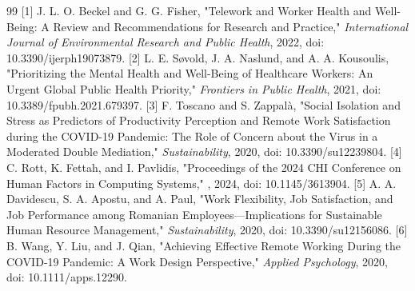 \documentclass[11pt]{article}
\begin{document}
\begin{thebibliography}{99}
 [1] J. L. O. Beckel and G. G. Fisher, "Telework and Worker Health and Well-Being: A Review and Recommendations for Research and Practice," \textit{International Journal of Environmental Research and Public Health}, 2022, doi: 10.3390/ijerph19073879.
 [2] L. E. Søvold, J. A. Naslund, and A. A. Kousoulis, "Prioritizing the Mental Health and Well-Being of Healthcare Workers: An Urgent Global Public Health Priority," \textit{Frontiers in Public Health}, 2021, doi: 10.3389/fpubh.2021.679397.
 [3] F. Toscano and S. Zappalà, "Social Isolation and Stress as Predictors of Productivity Perception and Remote Work Satisfaction during the COVID-19 Pandemic: The Role of Concern about the Virus in a Moderated Double Mediation," \textit{Sustainability}, 2020, doi: 10.3390/su12239804.
 [4] C. Rott, K. Fettah, and I. Pavlidis, "Proceedings of the 2024 CHI Conference on Human Factors in Computing Systems," , 2024, doi: 10.1145/3613904.
 [5] A. A. Davidescu, S. A. Apostu, and A. Paul, "Work Flexibility, Job Satisfaction, and Job Performance among Romanian Employees—Implications for Sustainable Human Resource Management," \textit{Sustainability}, 2020, doi: 10.3390/su12156086.
 [6] B. Wang, Y. Liu, and J. Qian, "Achieving Effective Remote Working During the COVID‐19 Pandemic: A Work Design Perspective," \textit{Applied Psychology}, 2020, doi: 10.1111/apps.12290.
\end{thebibliography}
\end{document}
